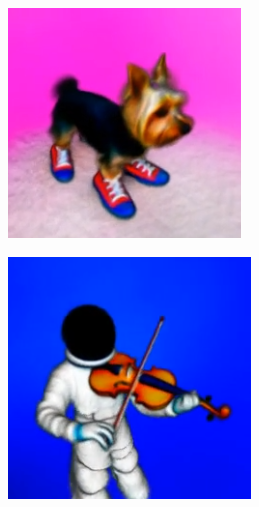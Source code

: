
\begin{figure}[ht]
    \centering
    \small
    \begin{subfigure}[b]{0.3\textwidth}
        \centering
        \includegraphics[width=\textwidth]{etc/Original/dreamfusion_a_yorkie_dog_wearing_extremely_cool_sneakers.PNG}
        \caption{}
    \end{subfigure}
    \begin{subfigure}[b]{0.3\textwidth}
        \centering
        \includegraphics[width=\textwidth]{etc/Original/dreamfusion_an_astronaut_playing_the_violin.PNG}

\end{subfigure}
\end{figure}
